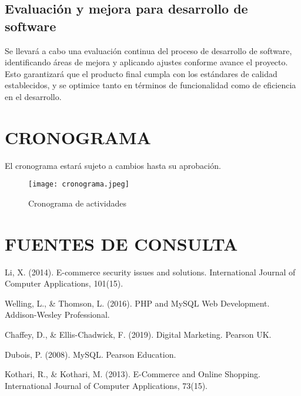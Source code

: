 \documentclass[conference]{IEEEtran}
\begin{document}
\subsection{Evaluación y mejora para desarrollo de software}

Se llevará a cabo una evaluación continua del proceso de desarrollo de software, identificando áreas de mejora y aplicando ajustes conforme avance el proyecto. Esto garantizará que el producto final cumpla con los estándares de calidad establecidos, y se optimice tanto en términos de funcionalidad como de eficiencia en el desarrollo.

\section{CRONOGRAMA}

El cronograma estará sujeto a cambios hasta su aprobación.

\begin{figure}[htbp]
  \centering
  \texttt{[image: cronograma.jpeg]}
  \caption{Cronograma de actividades}
  \label{fig:cronograma}
\end{figure}

\section{FUENTES DE CONSULTA}

\begin{thebibliography}{99}

Li, X. (2014). E-commerce security issues and solutions. International Journal of Computer Applications, 101(15).

Welling, L., \& Thomson, L. (2016). PHP and MySQL Web Development. Addison-Wesley Professional.

Chaffey, D., \& Ellis-Chadwick, F. (2019). Digital Marketing. Pearson UK.

Dubois, P. (2008). MySQL. Pearson Education.

Kothari, R., \& Kothari, M. (2013). E-Commerce and Online Shopping. International Journal of Computer Applications, 73(15).

\end{thebibliography}
\end{document}
